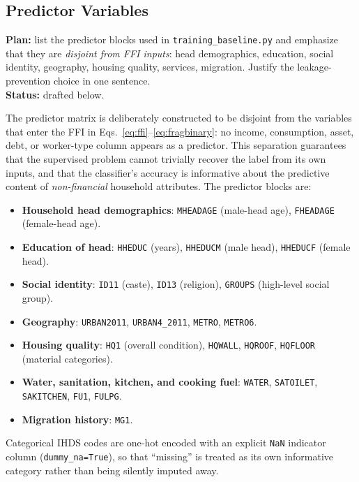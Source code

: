 \documentclass[colorlinks,balance]{asmeconf}
\begin{document}
\subsection{Predictor Variables}
\begin{outline}
\textbf{Plan:} list the predictor blocks used in \texttt{training\_baseline.py} and emphasize that they are \emph{disjoint from FFI inputs}: head demographics, education, social identity, geography, housing quality, services, migration. Justify the leakage-prevention choice in one sentence.\\
\textbf{Status:} drafted below.
\end{outline}
The predictor matrix is deliberately constructed to be disjoint from the variables that enter the FFI in Eqs.~\eqref{eq:ffi}--\eqref{eq:fragbinary}: no income, consumption, asset, debt, or worker-type column appears as a predictor. This separation guarantees that the supervised problem cannot trivially recover the label from its own inputs, and that the classifier's accuracy is informative about the predictive content of \emph{non-financial} household attributes. The predictor blocks are:
\begin{itemize}
\item \textbf{Household head demographics}: \texttt{MHEADAGE} (male-head age), \texttt{FHEADAGE} (female-head age).
\item \textbf{Education of head}: \texttt{HHEDUC} (years), \texttt{HHEDUCM} (male head), \texttt{HHEDUCF} (female head).
\item \textbf{Social identity}: \texttt{ID11} (caste), \texttt{ID13} (religion), \texttt{GROUPS} (high-level social group).
\item \textbf{Geography}: \texttt{URBAN2011}, \texttt{URBAN4\_2011}, \texttt{METRO}, \texttt{METRO6}.
\item \textbf{Housing quality}: \texttt{HQ1} (overall condition), \texttt{HQWALL}, \texttt{HQROOF}, \texttt{HQFLOOR} (material categories).
\item \textbf{Water, sanitation, kitchen, and cooking fuel}: \texttt{WATER}, \texttt{SATOILET}, \texttt{SAKITCHEN}, \texttt{FU1}, \texttt{FULPG}.
\item \textbf{Migration history}: \texttt{MG1}.
\end{itemize}
Categorical IHDS codes are one-hot encoded with an explicit \texttt{NaN} indicator column (\texttt{dummy\_na=True}), so that ``missing'' is treated as its own informative category rather than being silently imputed away.
\end{document}
